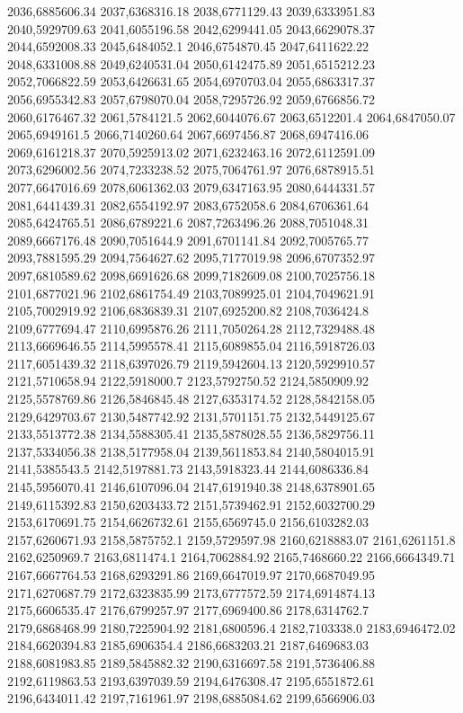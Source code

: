 2036,6885606.34
2037,6368316.18
2038,6771129.43
2039,6333951.83
2040,5929709.63
2041,6055196.58
2042,6299441.05
2043,6629078.37
2044,6592008.33
2045,6484052.1
2046,6754870.45
2047,6411622.22
2048,6331008.88
2049,6240531.04
2050,6142475.89
2051,6515212.23
2052,7066822.59
2053,6426631.65
2054,6970703.04
2055,6863317.37
2056,6955342.83
2057,6798070.04
2058,7295726.92
2059,6766856.72
2060,6176467.32
2061,5784121.5
2062,6044076.67
2063,6512201.4
2064,6847050.07
2065,6949161.5
2066,7140260.64
2067,6697456.87
2068,6947416.06
2069,6161218.37
2070,5925913.02
2071,6232463.16
2072,6112591.09
2073,6296002.56
2074,7233238.52
2075,7064761.97
2076,6878915.51
2077,6647016.69
2078,6061362.03
2079,6347163.95
2080,6444331.57
2081,6441439.31
2082,6554192.97
2083,6752058.6
2084,6706361.64
2085,6424765.51
2086,6789221.6
2087,7263496.26
2088,7051048.31
2089,6667176.48
2090,7051644.9
2091,6701141.84
2092,7005765.77
2093,7881595.29
2094,7564627.62
2095,7177019.98
2096,6707352.97
2097,6810589.62
2098,6691626.68
2099,7182609.08
2100,7025756.18
2101,6877021.96
2102,6861754.49
2103,7089925.01
2104,7049621.91
2105,7002919.92
2106,6836839.31
2107,6925200.82
2108,7036424.8
2109,6777694.47
2110,6995876.26
2111,7050264.28
2112,7329488.48
2113,6669646.55
2114,5995578.41
2115,6089855.04
2116,5918726.03
2117,6051439.32
2118,6397026.79
2119,5942604.13
2120,5929910.57
2121,5710658.94
2122,5918000.7
2123,5792750.52
2124,5850909.92
2125,5578769.86
2126,5846845.48
2127,6353174.52
2128,5842158.05
2129,6429703.67
2130,5487742.92
2131,5701151.75
2132,5449125.67
2133,5513772.38
2134,5588305.41
2135,5878028.55
2136,5829756.11
2137,5334056.38
2138,5177958.04
2139,5611853.84
2140,5804015.91
2141,5385543.5
2142,5197881.73
2143,5918323.44
2144,6086336.84
2145,5956070.41
2146,6107096.04
2147,6191940.38
2148,6378901.65
2149,6115392.83
2150,6203433.72
2151,5739462.91
2152,6032700.29
2153,6170691.75
2154,6626732.61
2155,6569745.0
2156,6103282.03
2157,6260671.93
2158,5875752.1
2159,5729597.98
2160,6218883.07
2161,6261151.8
2162,6250969.7
2163,6811474.1
2164,7062884.92
2165,7468660.22
2166,6664349.71
2167,6667764.53
2168,6293291.86
2169,6647019.97
2170,6687049.95
2171,6270687.79
2172,6323835.99
2173,6777572.59
2174,6914874.13
2175,6606535.47
2176,6799257.97
2177,6969400.86
2178,6314762.7
2179,6868468.99
2180,7225904.92
2181,6800596.4
2182,7103338.0
2183,6946472.02
2184,6620394.83
2185,6906354.4
2186,6683203.21
2187,6469683.03
2188,6081983.85
2189,5845882.32
2190,6316697.58
2191,5736406.88
2192,6119863.53
2193,6397039.59
2194,6476308.47
2195,6551872.61
2196,6434011.42
2197,7161961.97
2198,6885084.62
2199,6566906.03
